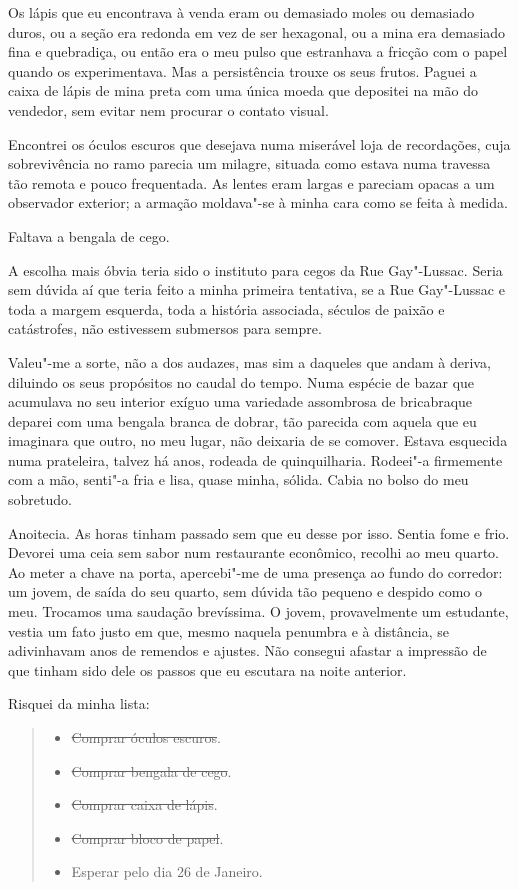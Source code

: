 Os lápis que eu encontrava à venda eram ou demasiado moles ou demasiado
duros, ou a seção era redonda em vez de ser hexagonal, ou a mina era
demasiado fina e quebradiça, ou então era o meu pulso que estranhava a
fricção com o papel quando os experimentava. Mas a persistência trouxe
os seus frutos. Paguei a caixa de lápis de mina preta com uma única
moeda que depositei na mão do vendedor, sem evitar nem procurar o
contato visual.

Encontrei os óculos escuros que desejava numa miserável loja de
recordações, cuja sobrevivência no ramo parecia um milagre, situada como
estava numa travessa tão remota e pouco frequentada. As lentes eram
largas e pareciam opacas a um observador exterior; a armação moldava"-se
à minha cara como se feita à medida.

Faltava a bengala de cego.

A escolha mais óbvia teria sido o instituto para cegos da Rue
Gay"-Lussac. Seria sem dúvida aí que teria feito a minha primeira
tentativa, se a Rue Gay"-Lussac e toda a margem esquerda, toda a história
associada, séculos de paixão e catástrofes, não estivessem submersos
para sempre.

Valeu"-me a sorte, não a dos audazes, mas sim a daqueles que andam à
deriva, diluindo os seus propósitos no caudal do tempo. Numa espécie de
bazar que acumulava no seu interior exíguo uma variedade assombrosa de
bricabraque deparei com uma bengala branca de dobrar, tão parecida com
aquela
que eu imaginara que outro, no meu lugar, não deixaria de se comover.
Estava esquecida numa prateleira, talvez há anos, rodeada de
quinquilharia. Rodeei"-a firmemente com a mão, senti"-a fria e lisa, quase
minha, sólida. Cabia no bolso do meu sobretudo.

Anoitecia. As horas tinham passado sem que eu desse por isso. Sentia
fome e frio. Devorei uma ceia sem sabor num restaurante econômico,
recolhi ao meu quarto. Ao meter a chave na porta, apercebi"-me de uma
presença ao fundo do corredor: um jovem, de saída do seu quarto, sem
dúvida tão pequeno e despido como o meu. Trocamos uma saudação
brevíssima. O jovem, provavelmente um estudante, vestia um fato justo em
que, mesmo naquela penumbra e à distância, se adivinhavam anos de
remendos e ajustes. Não consegui afastar a impressão de que tinham sido
dele os passos que eu escutara na noite anterior.

Risquei da minha lista:

\begin{quote}
\begin{itemize}
\item{}\sout{Comprar óculos escuros}.
\item{}\sout{Comprar bengala de cego}.
\item{}\sout{Comprar caixa de lápis}.
\item{}\sout{Comprar bloco de papel}.
\item{}Esperar pelo dia 26 de Janeiro.
\end{itemize}
\end{quote}

